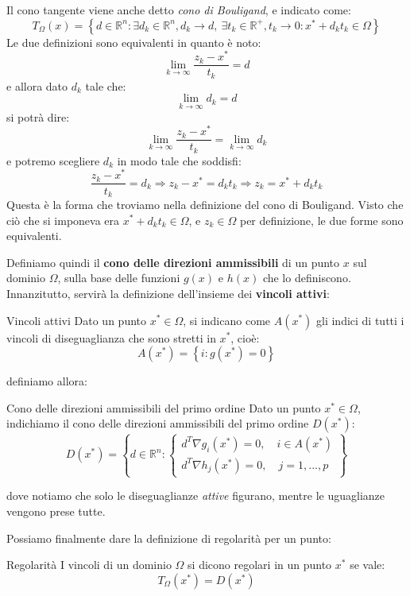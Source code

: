 \documentclass[a4paper,11pt]{article}
\begin{document}
\begin{itemize}
Il cono tangente viene anche detto \textit{cono di Bouligand}, e indicato come:
$$
T_\Omega(x) = \left\{ d \in \mathbb{R}^n : \exists d_k \in \mathbb{R}^n, d_k \rightarrow d, \ \exists t_k \in \mathbb{R}^+, t_k \rightarrow 0 : x^* + d_k t_k \in \Omega \right\}
$$
Le due definizioni sono equivalenti in quanto è noto:
$$
\lim_{k \rightarrow \infty} \frac{z_k - x^*}{t_k} = d
$$
e allora dato $d_k$ tale che:
$$
\lim_{k \rightarrow \infty} d_k = d
$$
si potrà dire:
$$
\lim_{k \rightarrow \infty} \frac{z_k - x^*}{t_k} = \lim_{k \rightarrow \infty} d_k 
$$
e potremo scegliere $d_k$ in modo tale che soddisfi:
$$
\frac{z_k - x^*}{t_k} = d_k \Rightarrow z_k - x^* = d_k t_k \Rightarrow z_k = x^* + d_k t_k
$$
Questa è la forma che troviamo nella definizione del cono di Bouligand.
Visto che ciò che si imponeva era $x^* + d_k t_k \in \Omega$, e $z_k \in \Omega$ per definizione, le due forme sono equivalenti.

\par\smallskip

Definiamo quindi il \textbf{cono delle direzioni ammissibili} di un punto $x$ sul dominio $\Omega$, sulla base delle funzioni $g(x)$ e $h(x)$ che lo definiscono.
Innanzitutto, servirà la definizione dell'insieme dei \textbf{vincoli attivi}:
\begin{definition}{Vincoli attivi}
	Dato un punto $x^* \in \Omega$, si indicano come $A(x^*)$ gli indici di tutti i vincoli di diseguaglianza che sono stretti in $x^*$, cioè:
	$$
		A(x^*) = \left\{ i : g(x^*) = 0 \right\}
	$$
\end{definition}
definiamo allora:
\begin{definition}{Cono delle direzioni ammissibili del primo ordine}
	Dato un punto $x^* \in \Omega$, indichiamo il cono delle direzioni ammissibili del primo ordine $D(x^*)$:
	$$
	D(x^*) = \left\{
			d \in \mathbb{R}^n : 	
			\begin{cases}
				d^T \nabla g_i(x^*) = 0, \quad i \in A(x^*) \\ 
				d^T \nabla h_j(x^*) = 0, \quad j = 1, ..., p
			\end{cases}
		\right\}
	$$
\end{definition}
dove notiamo che solo le diseguaglianze \textit{attive} figurano, mentre le uguaglianze vengono prese tutte.

Possiamo finalmente dare la definizione di regolarità per un punto:
\begin{definition}{Regolarità}
	I vincoli di un dominio $\Omega$ si dicono regolari in un punto $x^*$ se vale:
	$$
		T_\Omega(x^*) = D(x^*)
	$$
\end{definition}


\end{itemize}
\end{document}
